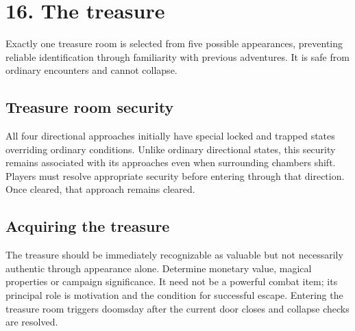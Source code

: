 \section{16. The treasure}

Exactly one treasure room is selected from five possible appearances, preventing reliable identification through familiarity with previous adventures. It is safe from ordinary encounters and cannot collapse.

\subsection{Treasure room security}

All four directional approaches initially have special locked and trapped states overriding ordinary conditions. Unlike ordinary directional states, this security remains associated with its approaches even when surrounding chambers shift. Players must resolve appropriate security before entering through that direction. Once cleared, that approach remains cleared.

\subsection{Acquiring the treasure}

The treasure should be immediately recognizable as valuable but not necessarily authentic through appearance alone. Determine monetary value, magical properties or campaign significance. It need not be a powerful combat item; its principal role is motivation and the condition for successful escape. Entering the treasure room triggers doomsday after the current door closes and collapse checks are resolved.
